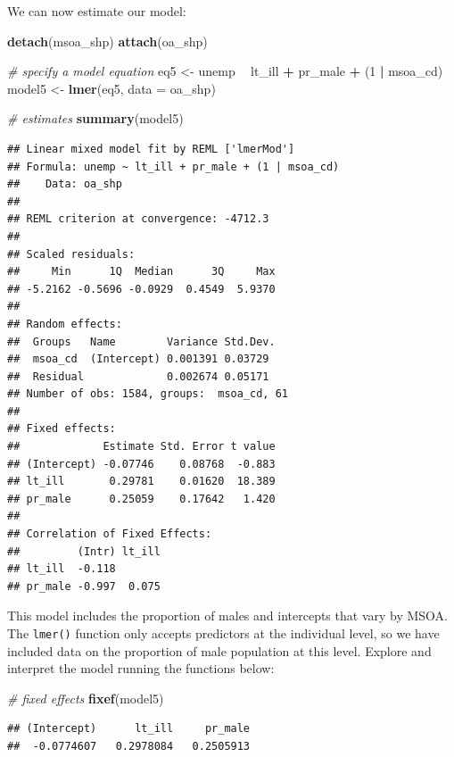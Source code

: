 \documentclass[
]{book}
\newenvironment{Shaded}{\begin{snugshade}}{\end{snugshade}}
\newcommand{\CommentTok}[1]{\textcolor[rgb]{0.56,0.35,0.01}{\textit{#1}}}
\newcommand{\DataTypeTok}[1]{\textcolor[rgb]{0.13,0.29,0.53}{#1}}
\newcommand{\DecValTok}[1]{\textcolor[rgb]{0.00,0.00,0.81}{#1}}
\newcommand{\KeywordTok}[1]{\textcolor[rgb]{0.13,0.29,0.53}{\textbf{#1}}}
\newcommand{\NormalTok}[1]{#1}
\newcommand{\OperatorTok}[1]{\textcolor[rgb]{0.81,0.36,0.00}{\textbf{#1}}}
\newcommand{\StringTok}[1]{\textcolor[rgb]{0.31,0.60,0.02}{#1}}
\begin{document}
We can now estimate our model:

\begin{Shaded}
\begin{Highlighting}[]
\KeywordTok{detach}\NormalTok{(msoa_shp)}
\KeywordTok{attach}\NormalTok{(oa_shp)}

\CommentTok{# specify a model equation}
\NormalTok{eq5 <-}\StringTok{ }\NormalTok{unemp }\OperatorTok{~}\StringTok{ }\NormalTok{lt_ill }\OperatorTok{+}\StringTok{ }\NormalTok{pr_male }\OperatorTok{+}\StringTok{ }\NormalTok{(}\DecValTok{1} \OperatorTok{|}\StringTok{ }\NormalTok{msoa_cd)}
\NormalTok{model5 <-}\StringTok{ }\KeywordTok{lmer}\NormalTok{(eq5, }\DataTypeTok{data =}\NormalTok{ oa_shp)}

\CommentTok{# estimates}
\KeywordTok{summary}\NormalTok{(model5)}
\end{Highlighting}
\end{Shaded}

\begin{verbatim}
## Linear mixed model fit by REML ['lmerMod']
## Formula: unemp ~ lt_ill + pr_male + (1 | msoa_cd)
##    Data: oa_shp
## 
## REML criterion at convergence: -4712.3
## 
## Scaled residuals: 
##     Min      1Q  Median      3Q     Max 
## -5.2162 -0.5696 -0.0929  0.4549  5.9370 
## 
## Random effects:
##  Groups   Name        Variance Std.Dev.
##  msoa_cd  (Intercept) 0.001391 0.03729 
##  Residual             0.002674 0.05171 
## Number of obs: 1584, groups:  msoa_cd, 61
## 
## Fixed effects:
##             Estimate Std. Error t value
## (Intercept) -0.07746    0.08768  -0.883
## lt_ill       0.29781    0.01620  18.389
## pr_male      0.25059    0.17642   1.420
## 
## Correlation of Fixed Effects:
##         (Intr) lt_ill
## lt_ill  -0.118       
## pr_male -0.997  0.075
\end{verbatim}

This model includes the proportion of males and intercepts that vary by MSOA. The \texttt{lmer()}
function only accepts predictors at the individual level, so we have included data on the proportion of male population at this level. Explore and interpret the model running the functions below:

\begin{Shaded}
\begin{Highlighting}[]
\CommentTok{# fixed effects}
\KeywordTok{fixef}\NormalTok{(model5)}
\end{Highlighting}
\end{Shaded}

\begin{verbatim}
## (Intercept)      lt_ill     pr_male 
##  -0.0774607   0.2978084   0.2505913
\end{verbatim}
\end{document}
